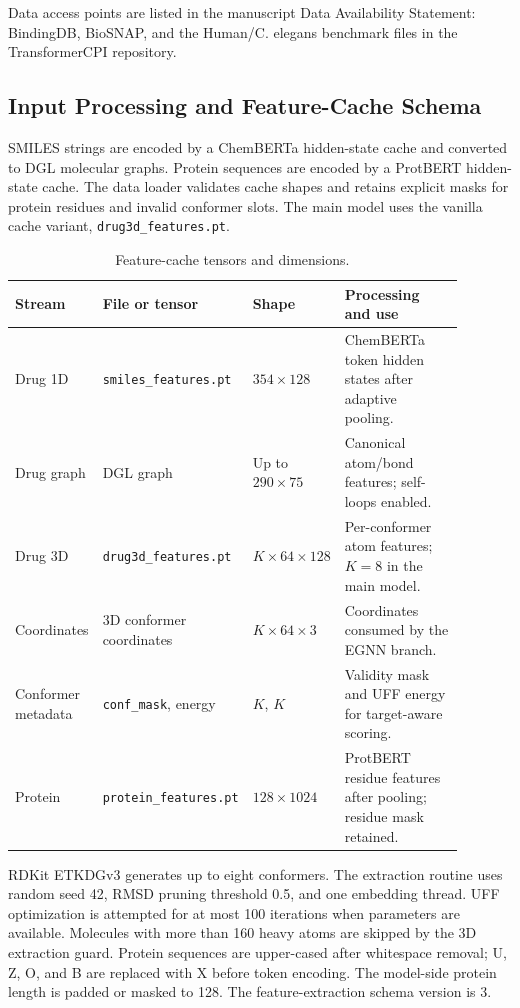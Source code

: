 Data access points are listed in the manuscript Data Availability Statement:
BindingDB, BioSNAP, and the Human/C. elegans benchmark files in the
TransformerCPI repository.

\subsection{Input Processing and Feature-Cache Schema}

SMILES strings are encoded by a ChemBERTa hidden-state cache and converted to
DGL molecular graphs. Protein sequences are encoded by a ProtBERT hidden-state
cache. The data loader validates cache shapes and retains explicit masks for
protein residues and invalid conformer slots. The main model uses the vanilla
cache variant, \texttt{drug3d\_features.pt}.

\begin{table}[!htbp]
\centering
\caption{Feature-cache tensors and dimensions.}
\label{tab:si_cache_schema}
\scriptsize
\setlength{\tabcolsep}{3pt}
\begin{tabular}{>{\RaggedRight\arraybackslash}p{0.15\linewidth}>{\RaggedRight\arraybackslash}p{0.24\linewidth}>{\RaggedRight\arraybackslash}p{0.18\linewidth}>{\RaggedRight\arraybackslash}p{0.32\linewidth}}
\toprule
Stream & File or tensor & Shape & Processing and use \\
\midrule
Drug 1D & \texttt{smiles\_features.pt} & $354\times128$ & ChemBERTa token hidden states after adaptive pooling. \\
Drug graph & DGL graph & Up to $290\times75$ & Canonical atom/bond features; self-loops enabled. \\
Drug 3D & \texttt{drug3d\_features.pt} & $K\times64\times128$ & Per-conformer atom features; $K=8$ in the main model. \\
Coordinates & 3D conformer coordinates & $K\times64\times3$ & Coordinates consumed by the EGNN branch. \\
Conformer metadata & \texttt{conf\_mask}, energy & $K$, $K$ & Validity mask and UFF energy for target-aware scoring. \\
Protein & \texttt{protein\_features.pt} & $128\times1024$ & ProtBERT residue features after pooling; residue mask retained. \\
\bottomrule
\end{tabular}
\end{table}

RDKit ETKDGv3 generates up to eight conformers. The extraction routine uses
random seed 42, RMSD pruning threshold 0.5, and one embedding thread. UFF
optimization is attempted for at most 100 iterations when parameters are
available. Molecules with more than 160 heavy atoms are skipped by the 3D
extraction guard. Protein sequences are upper-cased after whitespace removal;
U, Z, O, and B are replaced with X before token encoding. The model-side
protein length is padded or masked to 128. The feature-extraction schema
version is 3.

